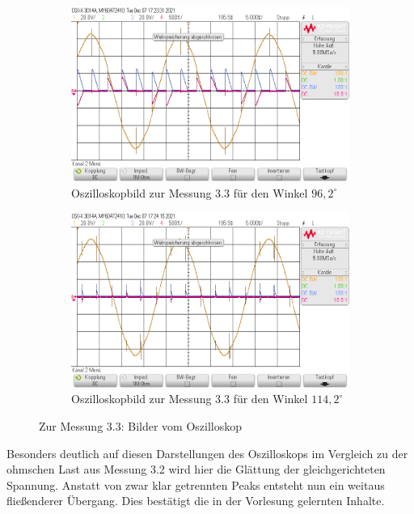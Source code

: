 \documentclass{article}
\begin{document}
\begin{figure}[h]
  \centering
  \begin{subfigure}{.45\textwidth}
    \centering
    \includegraphics[width=\linewidth]{../assets/images/GEP2/32_Winkel962.png}
    \caption{Oszilloskopbild zur Messung 3.3 für den Winkel $96,2^{\circ}$}
  \end{subfigure}
  \begin{subfigure}{.45\textwidth}
    \centering
    \includegraphics[width=\linewidth]{../assets/images/GEP2/32_Winkel1142.png}
    \caption{Oszilloskopbild zur Messung 3.3 für den Winkel $114,2^{\circ}$}
  \end{subfigure}
  \label{fig:31_242}
  \caption{Zur Messung 3.3: Bilder vom Oszilloskop}
\end{figure}

\noindent
Besonders deutlich auf diesen Darstellungen des Oszilloskops im Vergleich zu der ohmschen Last aus Messung 3.2 wird hier die Glättung der gleichgerichteten Spannung. Anstatt von zwar klar getrennten Peaks entsteht nun ein weitaus fließenderer Übergang. Dies bestätigt die in der Vorlesung gelernten Inhalte.
\newpage
\end{document}
